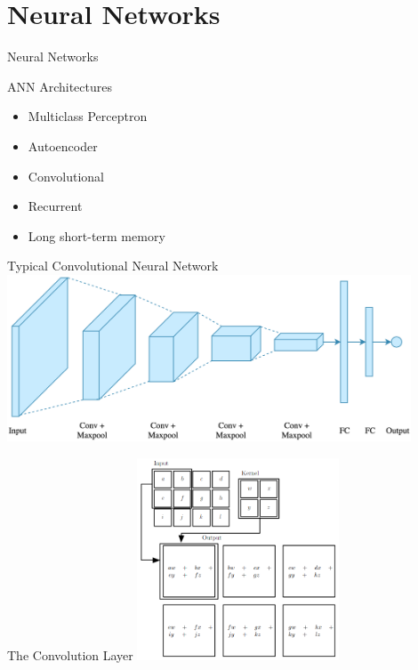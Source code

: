 \setlength{\parskip}{\baselineskip}
\section{Neural Networks}

\begin{frame}
	\huge Neural Networks
\end{frame}

\begin{frame}{ANN Architectures}
	\begin{itemize}
		\item Multiclass Perceptron
		\item Autoencoder
		\item Convolutional
		\item Recurrent
		\item Long short-term memory
	\end{itemize}
\end{frame}

\begin{frame}{Typical Convolutional Neural Network}
	\centering
	\includegraphics[width=0.9\textwidth]{../Images/CNNArchitectures/typical-cnn-architecture.png}\\
\end{frame}

\begin{frame}{The Convolution Layer}
	\centering
	\includegraphics[width=0.45\textwidth]{../Images/CNNArchitectures/convolution-operation.png}\\
\end{frame}

